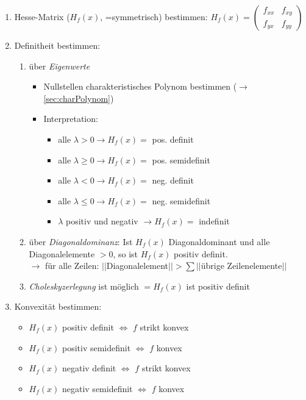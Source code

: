 \begin{enumerate}
    \item Hesse-Matrix (\(H_f(x)\), =symmetrisch) bestimmen:
            \(H_f(x) =
                \begin{pmatrix}
                    f_{xx} & f_{xy} \\
                    f_{yx} & f_{yy}
                \end{pmatrix}
            \)
    \item Definitheit bestimmen:
        \begin{enumerate}
            \item über \emph{Eigenwerte}
                \begin{itemize}
                    \item Nullstellen charakteristisches Polynom bestimmen (\(\rightarrow \) \ref{sec:charPolynom})
                    \item Interpretation:
                    \begin{itemize}
                        \item alle \(\lambda>0\rightarrow H_f(x)=\) pos. definit
                        \item alle \(\lambda\geq 0\rightarrow H_f(x)=\) pos. semidefinit 
                        \item alle \(\lambda<0\rightarrow H_f(x)=\) neg. definit 
                        \item alle \(\lambda\leq 0\rightarrow H_f(x)=\) neg. semidefinit 
                        \item \(\lambda\) positiv und negativ \(\rightarrow H_f(x)=\) indefinit
                    \end{itemize}
                \end{itemize}
            \item über \emph{Diagonaldominanz}: Ist \(H_f(x)\) Diagonaldominant und alle Diagonalelemente \(>0\), so ist \(H_f(x)\) positiv definit.\\
                \(\rightarrow \) für alle Zeilen: \(||\)Diagonalelement\(|| > \sum ||\)übrige Zeilenelemente\(||\) 
            \item \emph{Choleskyzerlegung} ist möglich \(= H_f(x)\) ist positiv definit
        \end{enumerate}
    \item Konvexität bestimmen:
        \begin{itemize}
            \item \(H_f(x)\) positiv definit \(\Leftrightarrow\) \(f\) strikt konvex
            \item \(H_f(x)\) positiv semidefinit \(\Leftrightarrow\) \(f\) konvex
            \item \(H_f(x)\) negativ definit \(\Leftrightarrow\) \(f\) strikt konvex
            \item \(H_f(x)\) negativ semidefinit \(\Leftrightarrow\) \(f\) konvex
        \end{itemize}
\end{enumerate}


